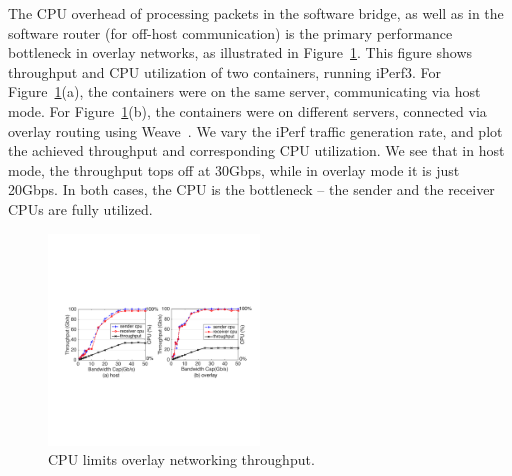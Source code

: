 The CPU overhead of processing packets in the software bridge, as well as in the
software router (for off-host communication) is the primary performance bottleneck 
in overlay networks, as illustrated in
Figure~\ref{fig:mot_bw_cpu}. This figure shows throughput and CPU utilization of
two containers, running iPerf3. For Figure~\ref{fig:mot_bw_cpu}(a), the
containers were on the same server, communicating via host mode. For
Figure~\ref{fig:mot_bw_cpu}(b), the containers were on different servers,
connected via overlay routing using Weave~\cite{weave}. We vary the iPerf
traffic generation rate, and plot the achieved throughput and corresponding CPU
utilization. We see that in host mode, the throughput tops off at 30Gbps, while
in overlay mode it is just 20Gbps. In both cases, the CPU is the bottleneck --
the sender and the receiver CPUs are fully utilized.

\begin{figure}[t]
\centering 
\includegraphics[width=0.5\textwidth]{figures/motivation/mot_bw_cpu2.pdf} 
\caption{\label{fig:mot_bw_cpu}CPU limits overlay networking throughput.}
\end{figure}
